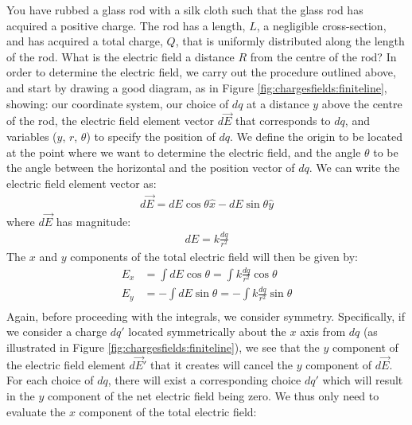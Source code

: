 \begin{example}{\label{ex:chargesfields:finiteline}You have rubbed a glass rod with a silk cloth such that the glass rod has acquired a positive charge. The rod has a length, $L$, a negligible cross-section, and has acquired a total charge, $Q$, that is uniformly distributed along the length of the rod. What is the electric field a distance $R$ from the centre of the rod?}
In order to determine the electric field, we carry out the procedure outlined above, and start by drawing a good diagram, as in Figure \ref{fig:chargesfields:finiteline}, showing: our coordinate system, our choice of $dq$ at a distance $y$ above the centre of the rod, the electric field element vector $d\vec E$ that corresponds to $dq$, and variables ($y$, $r$, $\theta$) to specify the position of $dq$.
We define the origin to be located at the point where we want to determine the electric field, and the angle $\theta$ to be the angle between the horizontal and the position vector of $dq$. We can write the electric field element vector as:
\begin{align*}
d\vec E = dE\cos\theta \hat x - dE\sin\theta \hat y
\end{align*}
where $d\vec E$ has magnitude:
\begin{align*}
dE = k\frac{dq}{r^2}
\end{align*}
The $x$ and $y$ components of the total electric field will then be given by:
\begin{align*}
E_x &= \int dE\cos\theta=\int k\frac{dq}{r^2}\cos\theta \\
E_y &= -\int dE\sin\theta=-\int k\frac{dq}{r^2}\sin\theta\\
\end{align*}
Again, before proceeding with the integrals, we consider symmetry. Specifically, if we consider a charge $dq'$ located symmetrically about the $x$ axis from $dq$ (as illustrated in Figure \ref{fig:chargesfields:finiteline}), we see that the $y$ component of the electric field element $d\vec E'$ that it creates will cancel the $y$ component of $d\vec E$. For each choice of $dq$, there will exist a corresponding choice $dq'$ which will result in the $y$ component of the net electric field being zero. We thus only need to evaluate the $x$ component of the total electric field:
\begin{align*}

\end{align*}
\end{example}
